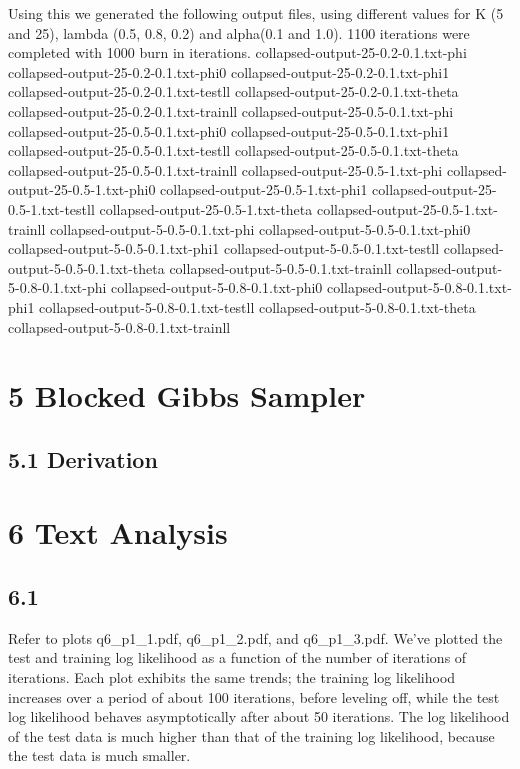 \documentclass{article}
\begin{document}
Using this we generated the following output files, using different values for K (5 and 25), lambda (0.5, 0.8, 0.2)
and alpha(0.1 and 1.0). 1100 iterations were completed with 1000 burn in iterations.
collapsed-output-25-0.2-0.1.txt-phi
collapsed-output-25-0.2-0.1.txt-phi0
collapsed-output-25-0.2-0.1.txt-phi1
collapsed-output-25-0.2-0.1.txt-testll
collapsed-output-25-0.2-0.1.txt-theta
collapsed-output-25-0.2-0.1.txt-trainll
collapsed-output-25-0.5-0.1.txt-phi
collapsed-output-25-0.5-0.1.txt-phi0
collapsed-output-25-0.5-0.1.txt-phi1
collapsed-output-25-0.5-0.1.txt-testll
collapsed-output-25-0.5-0.1.txt-theta
collapsed-output-25-0.5-0.1.txt-trainll
collapsed-output-25-0.5-1.txt-phi
collapsed-output-25-0.5-1.txt-phi0
collapsed-output-25-0.5-1.txt-phi1
collapsed-output-25-0.5-1.txt-testll
collapsed-output-25-0.5-1.txt-theta
collapsed-output-25-0.5-1.txt-trainll
collapsed-output-5-0.5-0.1.txt-phi
collapsed-output-5-0.5-0.1.txt-phi0
collapsed-output-5-0.5-0.1.txt-phi1
collapsed-output-5-0.5-0.1.txt-testll
collapsed-output-5-0.5-0.1.txt-theta
collapsed-output-5-0.5-0.1.txt-trainll
collapsed-output-5-0.8-0.1.txt-phi
collapsed-output-5-0.8-0.1.txt-phi0
collapsed-output-5-0.8-0.1.txt-phi1
collapsed-output-5-0.8-0.1.txt-testll
collapsed-output-5-0.8-0.1.txt-theta
collapsed-output-5-0.8-0.1.txt-trainll


\section*{5 Blocked Gibbs Sampler}
\subsection*{5.1 Derivation}

\section*{6 Text Analysis}
\subsection*{6.1}

Refer to plots q6_p1_1.pdf, q6_p1_2.pdf, and q6_p1_3.pdf. We've plotted the test and training log likelihood as a function of
the number of iterations of iterations. Each plot exhibits the same trends; the training log likelihood increases over a period
of about 100 iterations, before leveling off, while the test log likelihood behaves asymptotically after about 50 iterations. The
log likelihood of the test data is much higher than that of the training log likelihood, because the test data is much smaller.
\end{document}
